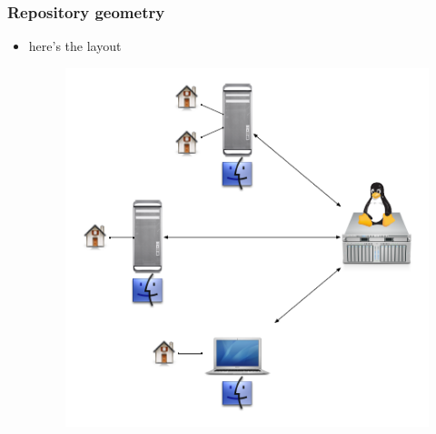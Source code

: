\begin{frame}[fragile]
%
  \frametitle{Repository geometry}
%
  \begin{itemize}
%
  \item here's the layout
    \begin{figure}
      \centering
      \includegraphics[scale=0.5]{figures/repository-geometry.pdf}
    \end{figure}
%
  \end{itemize}
%
\end{frame}

